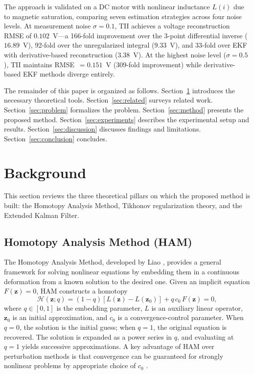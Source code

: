\documentclass[lettersize,journal]{IEEEtran}
\begin{document}
The approach is validated on a DC motor with nonlinear inductance $L(i)$ due to magnetic saturation, comparing seven estimation strategies across four noise levels. At measurement noise $\sigma = 0.1$, TII achieves a voltage reconstruction RMSE of $0.102$~V---a 166-fold improvement over the 3-point differential inverse ($16.89$~V), 92-fold over the unregularized integral ($9.33$~V), and 33-fold over EKF with derivative-based reconstruction ($3.38$~V). At the highest noise level ($\sigma = 0.5$), TII maintains RMSE~$= 0.151$~V (309-fold improvement) while derivative-based EKF methods diverge entirely.

The remainder of this paper is organized as follows. Section~\ref{sec:background} introduces the necessary theoretical tools. Section~\ref{sec:related} surveys related work. Section~\ref{sec:problem} formalizes the problem. Section~\ref{sec:method} presents the proposed method. Section~\ref{sec:experiments} describes the experimental setup and results. Section~\ref{sec:discussion} discusses findings and limitations. Section~\ref{sec:conclusion} concludes.

\section{Background}
\label{sec:background}

This section reviews the three theoretical pillars on which the proposed method is built: the Homotopy Analysis Method, Tikhonov regularization theory, and the Extended Kalman Filter.

\subsection{Homotopy Analysis Method (HAM)}

The Homotopy Analysis Method, developed by Liao \cite{liao2003, liao2012}, provides a general framework for solving nonlinear equations by embedding them in a continuous deformation from a known solution to the desired one. Given an implicit equation $F(\mathbf{z}) = 0$, HAM constructs a homotopy
\begin{equation}
\label{eq:homotopy}
\mathcal{H}(\mathbf{z}; q) = (1 - q)[L(\mathbf{z}) - L(\mathbf{z}_0)] + q\,c_0\,F(\mathbf{z}) = 0,
\end{equation}
where $q \in [0,1]$ is the embedding parameter, $L$ is an auxiliary linear operator, $\mathbf{z}_0$ is an initial approximation, and $c_0$ is a convergence-control parameter. When $q = 0$, the solution is the initial guess; when $q = 1$, the original equation is recovered. The solution is expanded as a power series in $q$, and evaluating at $q = 1$ yields successive approximations. A key advantage of HAM over perturbation methods is that convergence can be guaranteed for strongly nonlinear problems by appropriate choice of $c_0$ \cite{liao2003}.
\end{document}
